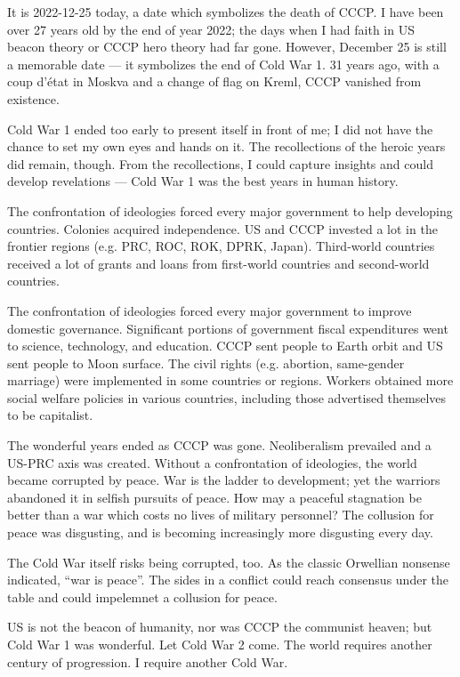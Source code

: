 
\begin{multicols*}{2}
	It is 2022-12-25 today, a date which symbolizes the death of CCCP.
	I have been over 27 years old by the end of year 2022;
	the days when I had faith in US beacon theory or CCCP hero theory had far gone.
	However, December 25 is still a memorable date --- it symbolizes the end of Cold War 1.
	31 years ago, with a coup d'\'etat in Moskva and a change of flag on Kreml, CCCP vanished from existence.

	Cold War 1 ended too early to present itself in front of me;
	I did not have the chance to set my own eyes and hands on it.
	The recollections of the heroic years did remain, though.
	From the recollections, I could capture insights and could develop revelations ---
	Cold War 1 was the best years in human history.

	The confrontation of ideologies forced every major government to help developing countries.
	Colonies acquired independence.
	US and CCCP invested a lot in the frontier regions (e.g. PRC, ROC, ROK, DPRK, Japan).
	Third-world countries received a lot of grants and loans from first-world countries and second-world countries.

	The confrontation of ideologies forced every major government to improve domestic governance.
	Significant portions of government fiscal expenditures went to science, technology, and education.
	CCCP sent people to Earth orbit and US sent people to Moon surface.
	The civil rights (e.g. abortion, same-gender marriage) were implemented in some countries or regions.
	Workers obtained more social welfare policies in various countries, including those advertised themselves to be capitalist.

	The wonderful years ended as CCCP was gone.
	Neoliberalism prevailed and a US-PRC axis was created.
	Without a confrontation of ideologies, the world became corrupted by peace.
	War is the ladder to development; yet the warriors abandoned it in selfish pursuits of peace.
	How may a peaceful stagnation be better than a war which costs no lives of military personnel?
	The collusion for peace was disgusting, and is becoming increasingly more disgusting every day.

    The Cold War itself risks being corrupted, too.
    As the classic Orwellian nonsense indicated, ``war is peace''.
    The sides in a conflict could reach consensus under the table and could impelemnet a collusion for peace.


	US is not the beacon of humanity, nor was CCCP the communist heaven; but Cold War 1 was wonderful.
	Let Cold War 2 come.
	The world requires another century of progression.
	I require another Cold War.
\end{multicols*}
